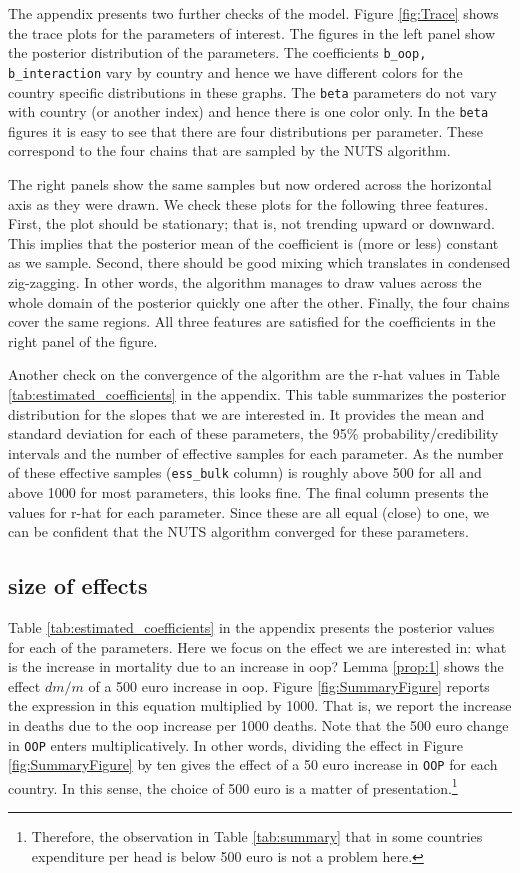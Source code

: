 \documentclass[a4paper,12pt]{article}
\begin{document}
The appendix presents two further checks of the model. Figure \ref{fig:Trace} shows the trace plots for the parameters of interest. The figures in the left panel show the posterior distribution of the parameters. The coefficients \texttt{b\_oop, b\_interaction} vary by country and hence we have different colors for the country specific distributions in these graphs. The \texttt{beta} parameters do not vary with country (or another index) and hence there is one color only. In the \texttt{beta} figures it is easy to see that there are four distributions per parameter. These correspond to the four chains that are sampled by the NUTS algorithm.

The right panels show the same samples but now ordered across the horizontal axis as they were drawn. We check these plots for the following three features. First, the plot should be stationary; that is, not trending upward or downward. This implies that the posterior mean of the coefficient is (more or less) constant as we sample. Second, there should be good mixing which translates in condensed zig-zagging. In other words, the algorithm manages to draw values across the whole domain of the posterior quickly one after the other. Finally, the four chains cover the same regions. All three features are satisfied for the coefficients in the right panel of the figure.

Another check on the convergence of the algorithm are the r-hat values in Table \ref{tab:estimated_coefficients} in the appendix. This table summarizes the posterior distribution for the slopes that we are interested in. It provides the mean and standard deviation for each of these parameters, the 95\% probability/credibility intervals and the number of effective samples for each parameter. As the number of these effective samples (\texttt{ess\_bulk} column) is roughly above 500 for all and above 1000 for most parameters, this looks fine. The final column presents the values for r-hat for each parameter. Since these are all equal (close) to one, we can be confident that the NUTS algorithm converged for these parameters.

\subsection{size of effects}
\label{sec:org56ead9b}

Table \ref{tab:estimated_coefficients} in the appendix presents the posterior values for each of the parameters. Here we focus on the effect we are interested in: what is the increase in mortality due to an increase in oop? Lemma \ref{prop:1} shows the effect \(dm/m\) of a 500 euro increase in oop. Figure \ref{fig:SummaryFigure} reports the expression in this equation multiplied by 1000. That is, we report the increase in deaths due to the oop increase per 1000 deaths. Note that the 500 euro change in \texttt{OOP} enters multiplicatively. In other words, dividing the effect in Figure \ref{fig:SummaryFigure} by ten gives the effect of a 50 euro increase in \texttt{OOP} for each country. In this sense, the choice of 500 euro is a matter of presentation.\footnote{Therefore, the observation in Table \ref{tab:summary} that in some countries expenditure per head is below 500 euro is not a problem here.}
\end{document}
